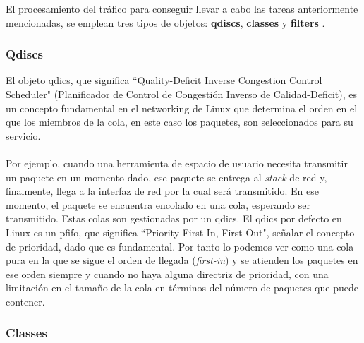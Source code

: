 El procesamiento del tráfico para conseguir llevar a cabo las tareas anteriormente mencionadas, se emplean tres tipos de objetos: \textbf{qdiscs}, \textbf{classes} y \textbf{filters} \cite{tc1}.

\subsubsection{Qdiscs}

El objeto qdics, que significa ``Quality-Deficit Inverse Congestion Control Scheduler" (Planificador de Control de Congestión Inverso de Calidad-Deficit), es un concepto fundamental en el networking de Linux que determina el orden en el que los miembros de la cola, en este caso los paquetes, son seleccionados para su servicio. \\
\\
Por ejemplo, cuando una herramienta de espacio de usuario necesita transmitir un paquete en un momento dado, ese paquete se entrega al \textit{stack} de red y, finalmente, llega a la interfaz de red por la cual será transmitido. En ese momento, el paquete se encuentra encolado en una cola, esperando ser transmitido. Estas colas son gestionadas por un qdics. El qdics por defecto en Linux es un pfifo, que significa ``Priority-First-In, First-Out", señalar el concepto de prioridad, dado que es fundamental. Por tanto lo podemos ver como una cola pura en la que se sigue el orden de llegada (\textit{first-in}) y se atienden los paquetes en ese orden siempre y cuando no haya alguna directriz de prioridad, con una limitación en el tamaño de la cola en términos del número de paquetes que puede contener.

\subsubsection{Classes}


